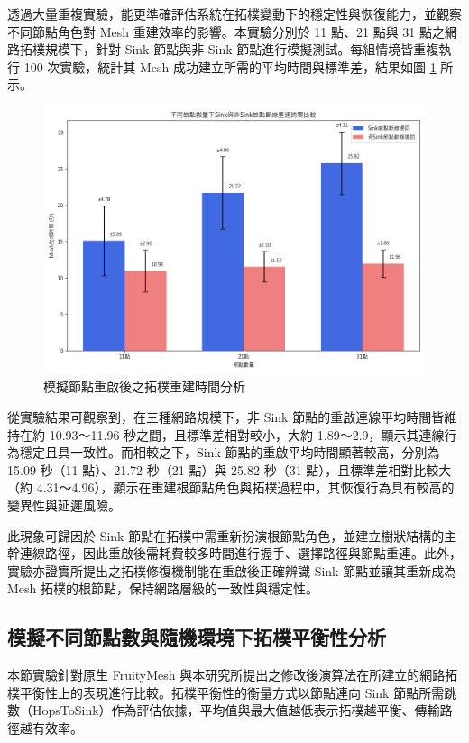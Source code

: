 \begin{ZhChapter}
透過大量重複實驗，能更準確評估系統在拓樸變動下的穩定性與恢復能力，並觀察不同節點角色對 Mesh 重建效率的影響。本實驗分別於 11 點、21 點與 31 點之網路拓樸規模下，針對 Sink 節點與非 Sink 節點進行模擬測試。每組情境皆重複執行 100 次實驗，統計其 Mesh 成功建立所需的平均時間與標準差，結果如圖 \ref{fig: 節點重啟後之拓樸重建時間分析} 所示。

\begin{figure}[H]
    \centering
    \includegraphics[width = 1\textwidth]{image/補實驗節點重啟後之拓樸重建時間分析.png}
    \caption{模擬節點重啟後之拓樸重建時間分析}
    \label{fig: 節點重啟後之拓樸重建時間分析}
\end{figure}

從實驗結果可觀察到，在三種網路規模下，非 Sink 節點的重啟連線平均時間皆維持在約 10.93～11.96 秒之間，且標準差相對較小，大約 1.89～2.9，顯示其連線行為穩定且具一致性。而相較之下，Sink 節點的重啟平均時間顯著較高，分別為 15.09 秒（11 點）、21.72 秒（21 點）與 25.82 秒（31 點），且標準差相對比較大（約 4.31～4.96），顯示在重建根節點角色與拓樸過程中，其恢復行為具有較高的變異性與延遲風險。

此現象可歸因於 Sink 節點在拓樸中需重新扮演根節點角色，並建立樹狀結構的主幹連線路徑，因此重啟後需耗費較多時間進行握手、選擇路徑與節點重連。此外，實驗亦證實所提出之拓樸修復機制能在重啟後正確辨識 Sink 節點並讓其重新成為 Mesh 拓樸的根節點，保持網路層級的一致性與穩定性。

\subsection{模擬不同節點數與隨機環境下拓樸平衡性分析}
本節實驗針對原生 FruityMesh 與本研究所提出之修改後演算法在所建立的網路拓樸平衡性上的表現進行比較。拓樸平衡性的衡量方式以節點連向 Sink 節點所需跳數（HopsToSink）作為評估依據，平均值與最大值越低表示拓樸越平衡、傳輸路徑越有效率。


\end{ZhChapter}
